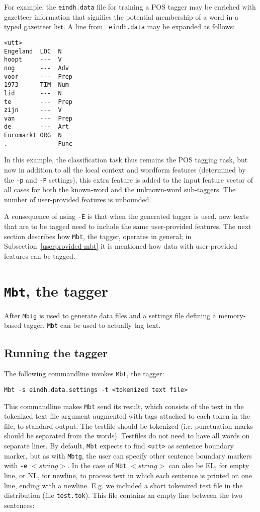 \documentclass{report}
\begin{document}
For example, the {\tt eindh.data} file for training a POS tagger may
be enriched with gazetteer information that signifies the potential
membership of a word in a typed gazetteer list. A line from {\tt
  eindh.data} may be expanded as follows:

{\small
\begin{verbatim}
<utt>
Engeland  LOC  N
hoopt     ---  V
nog       ---  Adv
voor      ---  Prep
1973      TIM  Num
lid       ---  N
te        ---  Prep
zijn      ---  V
van       ---  Prep
de        ---  Art
Euromarkt ORG  N
.         ---  Punc
\end{verbatim}
}

In this example, the classification task thus remains the POS tagging
task, but now in addition to all the local context and wordform
features (determined by the {\tt -p} and {\tt -P} settings), this
extra feature is added to the input feature vector of all cases for
both the known-word and the unknown-word sub-taggers. The number of
user-provided features is unbounded.

A consequence of using {\tt -E} is that when the generated tagger is
used, new texts that are to be tagged need to include the same
user-provided features. The next section describes how {\tt Mbt}, the
tagger, operates in general; in Subsection~\ref{userprovided-mbt} it
is mentioned how data with user-provided features can be tagged.

\section{{\tt Mbt}, the tagger}

After {\tt Mbtg} is used to generate data files and a settings file
defining a memory-based tagger, {\tt Mbt} can be used to actually tag
text.

\subsection{Running the tagger}

The following commandline invokes {\tt Mbt}, the tagger:

{\small
\begin{verbatim}
Mbt -s eindh.data.settings -t <tokenized text file>
\end{verbatim}
}

This commandline makes {\tt Mbt} send its result, which consists of
the text in the tokenized text file argument augmented with tags
attached to each token in the file, to standard output. The testfile
should be tokenized (i.e. punctuation marks should be separated from
the words). Testfiles do not need to have all words on separate
lines. By default, {\tt Mbt} expects to find {\tt <utt>} as sentence
boundary marker, but as with {\tt Mbtg}, the user can specify other sentence
boundary markers with {\tt -e} $<string>$. In the case of {\tt Mbt}
$<string>$ can also be EL, for empty line, or NL, for newline, to
process text in which each sentence is printed on one line, ending
with a newline. E.g. we included a short tokenized test file in the
distribution (file {\tt test.tok}). This file contains an empty line
between the two sentences:
\end{document}
